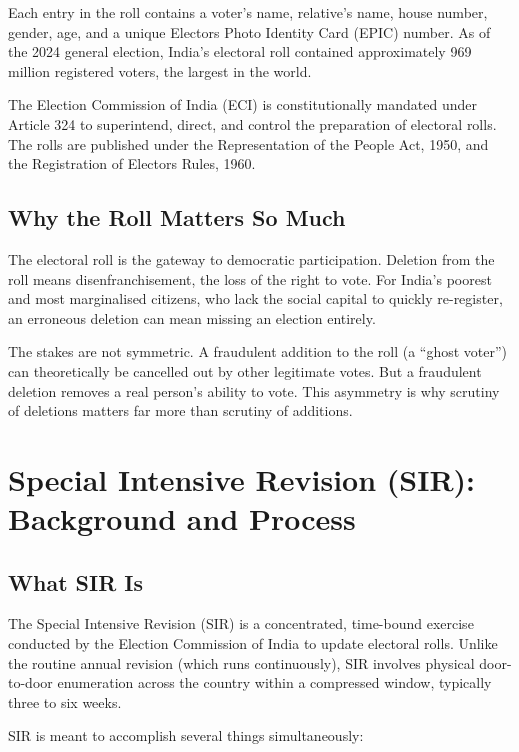 \documentclass[11pt, a4paper]{article}
\begin{document}
Each entry in the roll contains a voter's name, relative's name, house number, gender, age, and a unique Electors Photo Identity Card (EPIC) number. As of the 2024 general election, India's electoral roll contained approximately 969 million registered voters, the largest in the world.

The Election Commission of India (ECI) is constitutionally mandated under Article 324 to superintend, direct, and control the preparation of electoral rolls. The rolls are published under the Representation of the People Act, 1950, and the Registration of Electors Rules, 1960.

\subsection{Why the Roll Matters So Much}

The electoral roll is the gateway to democratic participation. Deletion from the roll means disenfranchisement, the loss of the right to vote. For India's poorest and most marginalised citizens, who lack the social capital to quickly re-register, an erroneous deletion can mean missing an election entirely.

The stakes are not symmetric. A fraudulent addition to the roll (a ``ghost voter'') can theoretically be cancelled out by other legitimate votes. But a fraudulent deletion removes a real person's ability to vote. This asymmetry is why scrutiny of deletions matters far more than scrutiny of additions.

\section{Special Intensive Revision (SIR): Background and Process}

\subsection{What SIR Is}

The Special Intensive Revision (SIR) is a concentrated, time-bound exercise conducted by the Election Commission of India to update electoral rolls. Unlike the routine annual revision (which runs continuously), SIR involves physical door-to-door enumeration across the country within a compressed window, typically three to six weeks.

SIR is meant to accomplish several things simultaneously:
\end{document}
